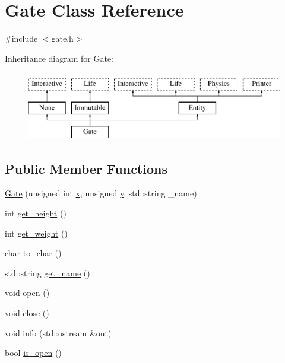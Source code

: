 \hypertarget{class_gate}{\section{Gate Class Reference}
\label{class_gate}
}


{\ttfamily \#include $<$gate.\-h$>$}

Inheritance diagram for Gate\-:\begin{figure}[H]
\begin{center}
\leavevmode
\includegraphics[height=3.000000cm]{class_gate}
\end{center}
\end{figure}
\subsection*{Public Member Functions}
\begin{DoxyCompactItemize}
\item 
\hyperlink{class_gate_a8c222415d9aa37b3057038e0fa1cb20f}{Gate} (unsigned int \hyperlink{class_entity_afa8f48eccdb09a290e2c1ded3f135363}{x}, unsigned \hyperlink{class_entity_a9d39843430829a89bb8233dbaadae4f1}{y}, std\-::string \-\_\-name)
\item 
int \hyperlink{class_gate_a92969268c88df32619ae44de87614cf8}{get\-\_\-height} ()
\item 
int \hyperlink{class_gate_a71358b21088e77ddcd7c1980e13ba063}{get\-\_\-weight} ()
\item 
char \hyperlink{class_gate_a4c957d7092b0c53a0a8e711142818dfa}{to\-\_\-char} ()
\item 
std\-::string \hyperlink{class_gate_a26fc1621b08010e7f712b68d665a6aa7}{get\-\_\-name} ()
\item 
void \hyperlink{class_gate_a6b6e01294cd8f5dbb5c93831c5cd3c3f}{open} ()
\item 
void \hyperlink{class_gate_a3733611cc86dfe641915fcbfaf4d41c8}{close} ()
\item 
void \hyperlink{class_gate_a194b57934f4ab3ed226a7c5fb45693bd}{info} (std\-::ostream \&out)
\item 
bool \hyperlink{class_gate_a5cb8530f286fcbe2c40d7f396176b805}{is\-\_\-open} ()
\end{DoxyCompactItemize}
